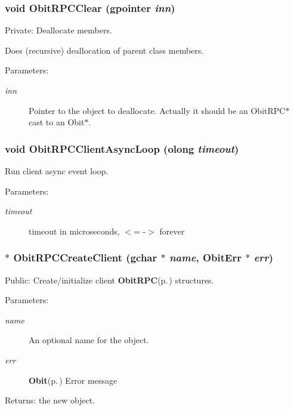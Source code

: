 \subsubsection{\setlength{\rightskip}{0pt plus 5cm}void Obit\-RPCClear (gpointer {\em inn})}\label{ObitRPC_8c_a4}


Private: Deallocate members. 

Does (recursive) deallocation of parent class members. \begin{Desc}
\item[Parameters:]
\begin{description}
\item[{\em inn}]Pointer to the object to deallocate. Actually it should be an Obit\-RPC$\ast$ cast to an Obit$\ast$. \end{description}
\end{Desc}
\subsubsection{\setlength{\rightskip}{0pt plus 5cm}void Obit\-RPCClient\-Async\-Loop ({\bf olong} {\em timeout})}\label{ObitRPC_8c_a16}


Run client async event loop. 

\begin{Desc}
\item[Parameters:]
\begin{description}
\item[{\em timeout}]timeout in microseconds, $<$= -$>$ forever \end{description}
\end{Desc}
\subsubsection{$\ast$ Obit\-RPCCreate\-Client (gchar $\ast$ {\em name}, {\bf Obit\-Err} $\ast$ {\em err})}\label{ObitRPC_8c_a9}


Public: Create/initialize client {\bf Obit\-RPC}{\rm (p.\,\pageref{structObitRPC})} structures. 

\begin{Desc}
\item[Parameters:]
\begin{description}
\item[{\em name}]An optional name for the object. \item[{\em err}]{\bf Obit}{\rm (p.\,\pageref{structObit})} Error message \end{description}
\end{Desc}
\begin{Desc}
\item[Returns:]the new object. \end{Desc}
